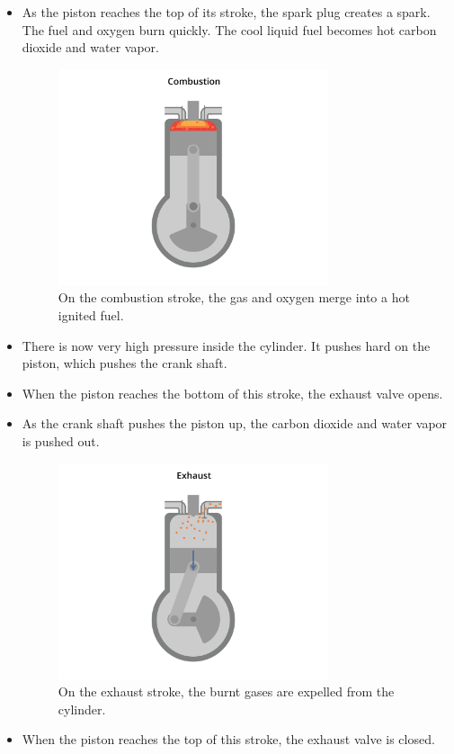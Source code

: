 \begin{itemize}
\item As the piston reaches the top of its stroke, the spark plug creates a spark. The fuel and oxygen burn quickly. The cool liquid fuel becomes hot carbon dioxide and water vapor.
\begin{figure}[htbp]
    \centering
    \includegraphics[width=0.75\textwidth]{engine-11.png}
    \caption{On the combustion stroke, the gas and oxygen merge into a hot ignited fuel.}
    \label{fig:engine-11}
\end{figure}

\item There is now very high pressure inside the cylinder. It pushes hard on the piston, which pushes the crank shaft.
\item When the piston reaches the bottom of this stroke, the exhaust valve opens.
\item As the crank shaft pushes the piston up, the carbon dioxide and water vapor is pushed out.

\begin{figure}[htbp]
    \centering
    \includegraphics[width=0.75\textwidth]{engine-12.png}
    \caption{On the exhaust stroke, the burnt gases are expelled from the cylinder.}
    \label{fig:engine-12}
\end{figure}

\item When the piston reaches the top of this stroke, the exhaust valve is closed.
\end{itemize}

